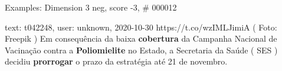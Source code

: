 \begin{frame}{Examples: Dimension 3 neg, score -3, \# 000012}
\footnotesize
\begin{alertblock}{text: t042248, user: unknown, 2020-10-30}
https://t.co/wzIMLJimiA ( Foto: Freepik ) Em consequência da baixa 
\textbf{cobertura} da Campanha Nacional de Vacinação contra a 
\textbf{Poliomielite} no Estado, a Secretaria da Saúde ( SES ) decidiu 
\textbf{prorrogar} o prazo da estratégia até 21 de novembro. 
\end{alertblock}
\end{frame}
